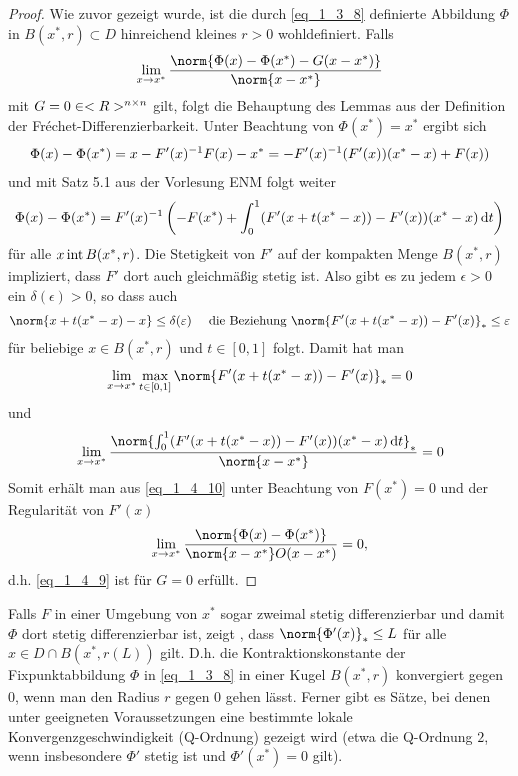 \begin{proof}
	Wie zuvor gezeigt wurde, ist die durch \cref{eq_1_3_8} definierte Abbildung $\Phi$ in $B(x^{\ast},r)\subset D$ hinreichend kleines $r>0$ wohldefiniert. Falls
	\begin{align}
		\lim_{x\to x^{\ast}} \frac{\norm{\Phi(x) - \Phi(x^{\ast}) - G(x-x^{\ast})}}{\norm{x-x^{\ast}}} \label{eq_1_4_9}
	\end{align}
	mit $G = 0\in <R>^{n \times n}$ gilt, folgt die Behauptung des Lemmas aus der Definition der Fréchet-Differenzierbarkeit. Unter Beachtung von $\Phi(x^{\ast}) = x^{\ast}$ ergibt sich
	\begin{align}
	\Phi(x) - \Phi(x^{\ast}) = x - F'(x)^{-1}F(x) - x^{\ast} = -F'(x)^{-1}(F'(x))(x^{\ast}-x)+F(x))\notag
	\end{align}
	und mit Satz 5.1 aus der Vorlesung ENM folgt weiter
	\begin{align}
		\Phi(x) - \Phi(x^{\ast}) = F'(x)^{-1}\left( -F(x^{\ast}) + \int_{0}^{1} (F'(x+t(x^{\ast}-x)) - F'(x))(x^{\ast}-x)\,\mathrm{d} t\right)\label{eq_1_4_10}
	\end{align}
	für alle $x \operatorname{int} B(x^{\ast},r)$. Die Stetigkeit von $F'$ auf der kompakten Menge $B(x^{\ast},r)$ impliziert, dass $F'$ dort auch gleichmäßig stetig ist. Also gibt es zu jedem $\epsilon > 0$ ein $\delta(\epsilon) > 0$, so dass auch
	\begin{align}
		\norm{x+t(x^{\ast}-x) - x}\le \delta(\epsilon) \quad \text{ die Beziehung } \norm{F'(x+t(x^{\ast}-x)) -F'(x)}_{\ast} \le \epsilon\notag
	\end{align}
	für beliebige $x \in B(x^{\ast},r)$ und $t \in [0,1]$ folgt. Damit hat man
	\begin{align}
		\lim_{x\to x^{\ast}}\max_{t\in[0,1]} \norm{F'(x+t(x^{\ast}-x)) -F'(x)}_{\ast} = 0 \notag
	\end{align}
	und
	\begin{align}
		\lim_{x\to x^{\ast}} \frac{\norm{\int_{0}^{1} (F'(x+t(x^{\ast} - x)) -F'(x))(x^{\ast}-x)\diff t}_{\ast}}{\norm{x-x^{\ast}}} = 0 \notag
	\end{align}
	Somit erhält man aus \cref{eq_1_4_10} unter Beachtung von $F(x^{\ast}) = 0$ und der Regularität von $F'(x)$
	\begin{align}
		\lim_{x\to x^{\ast}} \frac{\norm{\Phi(x) - \Phi(x^{\ast})}}{\norm{x-x^{\ast}}O(x-x^{\ast})} = 0,\notag
	\end{align} %
	d.h. \cref{eq_1_4_9} ist für $G=0$ erfüllt.
\end{proof}

\begin{remark}
	Falls $F$ in einer Umgebung von $x^{\ast}$ sogar zweimal stetig differenzierbar und damit $\Phi$ dort stetig differenzierbar ist, zeigt , dass $\norm{\Phi'(x)}_{\ast} \le L$ für alle $x \in D \cap B(x^{\ast},r(L))$ gilt. D.h. die Kontraktionskonstante der Fixpunktabbildung $\Phi$ in \cref{eq_1_3_8} in einer Kugel $B(x^{\ast},r)$ konvergiert gegen $0$, wenn man den Radius $r$ gegen $0$ gehen lässt. Ferner gibt es Sätze, bei denen unter geeigneten Voraussetzungen eine bestimmte lokale Konvergenzgeschwindigkeit (Q-Ordnung) gezeigt wird (etwa die Q-Ordnung $2$, wenn insbesondere $\Phi'$ stetig ist und $\Phi'(x^{\ast}) = 0$ gilt).
\end{remark}